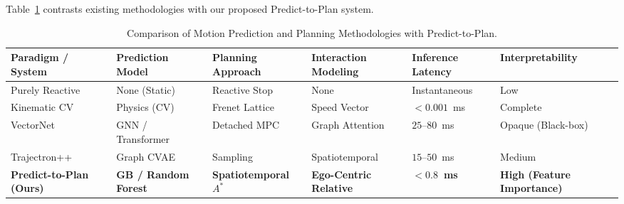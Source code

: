 \documentclass[runningheads]{llncs}
\begin{document}
Table~\ref{tab:comparison} contrasts existing methodologies with our proposed Predict-to-Plan system.

\begin{table}[t]
\caption{Comparison of Motion Prediction and Planning Methodologies with Predict-to-Plan.}
\label{tab:comparison}
\centering
\begin{tabularx}{\textwidth}{lXXXXX}
\toprule
\textbf{Paradigm / System} & \textbf{Prediction Model} & \textbf{Planning Approach} & \textbf{Interaction Modeling} & \textbf{Inference Latency} & \textbf{Interpretability} \\
\midrule
Purely Reactive~\cite{paden2016survey} & None (Static) & Reactive Stop & None & Instantaneous & Low \\
Kinematic CV~\cite{werling2010optimal} & Physics (CV) & Frenet Lattice & Speed Vector & $< 0.001$~ms & Complete \\
VectorNet~\cite{gao2020vectornet} & GNN / Transformer & Detached MPC & Graph Attention & $25$--$80$~ms & Opaque (Black-box) \\
Trajectron++~\cite{salzmann2020trajectron++} & Graph CVAE & Sampling & Spatiotemporal & $15$--$50$~ms & Medium \\
\midrule
\textbf{Predict-to-Plan (Ours)} & \textbf{GB / Random Forest} & \textbf{Spatiotemporal $A^*$} & \textbf{Ego-Centric Relative} & \textbf{$< 0.8$~ms} & \textbf{High (Feature Importance)} \\
\bottomrule
\end{tabularx}
\end{table}
\end{document}
